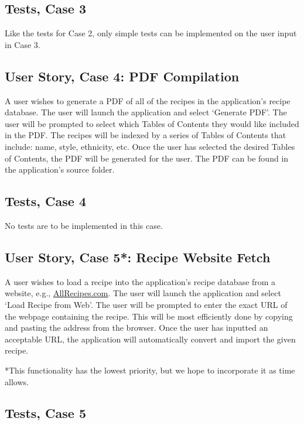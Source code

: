 \documentclass[landscape]{article}
\begin{document}
\subsection{Tests, Case 3}

Like the tests for Case 2, only simple tests can be implemented on the user input in Case 3.

\subsection{User Story, Case 4: PDF Compilation}

A user wishes to generate a PDF of all of the recipes in the application's recipe database. The user will launch the application and select `Generate PDF'.  The user will be prompted to select which Tables of Contents they would like included in the PDF. The recipes will be indexed by a series of Tables of Contents that include: name, style, ethnicity, etc. Once the user has selected the desired Tables of Contents, the PDF will be generated for the user. The PDF can be found in the application's source folder.

\subsection{Tests, Case 4}

No tests are to be implemented in this case.

\subsection{User Story, Case 5*: Recipe Website Fetch}

A user wishes to load a recipe into the application’s recipe database from a website, e.g., \href{http://allrecipes.com/}{AllRecipes.com}. The user will launch the application and select `Load Recipe from Web'. The user will be prompted to enter the exact URL of the webpage containing the recipe. This will be most efficiently done by copying and pasting the address from the browser. Once the user has inputted an acceptable URL, the application will automatically convert and import the given recipe.

*This functionality has the lowest priority, but we hope to incorporate it as time allows.

\subsection{Tests, Case 5}
\end{document}
